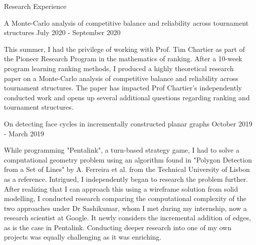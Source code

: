 \documentclass{resume} %
\begin{document}
\begin{rSection}{Research Experience}



\begin{rSubsection}{ A Monte-Carlo analysis of competitive balance and reliability across tournament structures }{ July 2020 - September 2020 }{}
\item  This summer, I had the privilege of working with Prof. Tim Chartier as part of the Pioneer Research Program in the mathematics of ranking. After a 10-week program learning ranking methods, I produced a highly theoretical research paper on a Monte-Carlo analysis of competitive balance and reliability across tournament structures. The paper has impacted Prof Chartier's independently conducted work and opens up several additional questions regarding ranking and tournament structures.  

\end{rSubsection}



\begin{rSubsection}{ On detecting face cycles in incrementally constructed planar graphs }{ October 2019 - March 2019 }{}
\item While programming "Pentalink", a turn-based strategy game, I had to solve a computational geometry problem using an algorithm found in "Polygon Detection from a Set of Lines" by A. Ferreira et al. from the Technical University of Lisbon as a reference. Intrigued, I independently began to research the problem further. After realizing that I can approach this using a wireframe solution from solid modelling, I conducted research comparing the computational complexity of the two approaches under Dr Sashikumar, whom I met during my internship, now a research scientist at Google. It newly considers the incremental addition of edges, as is the case in Pentalink. Conducting deeper research into one of my own projects was equally challenging as it was enriching. 

\end{rSubsection}


\end{rSection}
\end{document}
